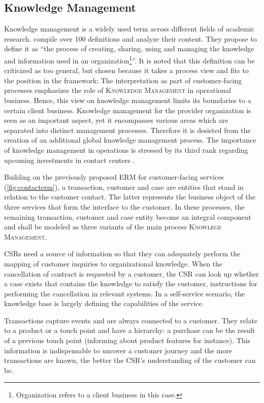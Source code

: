 	 
	 \subsection{Knowledge Management}
	 

Knowledge management is a widely used term across different fields of academic research. \cite{girard2015defining} compile over 100 definitions and analyze their content. They propose to define it as \enquote{the process of creating, sharing, using and managing the knowledge and information used in an organization\footnote{Organization refers to a client business in this case.}}\citep[]{girard2015defining}. It is noted that this definition can be criticized as too general, but chosen because it takes a process view and fits to the position in the framework: The interpretation as part of customer-facing processes emphasizes the role of \textsc{Knowledge Management} in operational business. Hence, this view on knowledge management limits its boundaries to a certain client business. Knowledge management for the provider organization is seen as an important aspect, yet it encompasses various areas which are separated into distinct management processes. Therefore it is desisted from the creation of an additional global knowledge management process. The importance of knowledge management in operations is stressed by its third rank regarding upcoming investments in contact centers \citep{ccnet2016}. 

Building on the previously proposed \acrshort{ERM} for customer-facing services (\Fig \ref{fig:contacterm}), a transaction, customer and case are entities that stand in relation to the customer contact. The latter represents the business object of the three services that form the interface to the customer. In these processes, the remaining transaction, customer and case entity become an integral component and shall be modeled as three variants of the main process \textsc{Knowlege Management}.

\acrshort{CSR}s need a source of information so that they can adequately perform the mapping of customer inquiries to organizational knowledge. When the cancellation of contract is requested by a customer, the \acrshort{CSR} can look up whether a case exists that contains the knowledge to satisfy the customer, \viz instructions for performing the cancellation in relevant systems. In a self-service scenario, the knowledge base is largely defining the capabilities of the service. 

Transactions capture events and are always connected to a customer. They relate to a product or a touch point and have a hierarchy: a purchase can be the result of a previous touch point (informing about product features for instance). This information is 	indispensable to uncover a customer journey and the more transactions are known, the better the \acrshort{CSR}'s understanding of the customer can be. 

